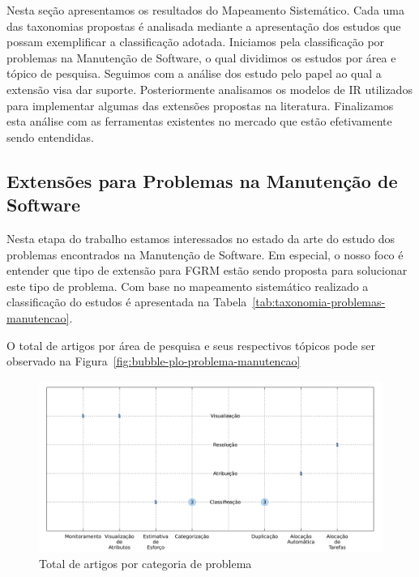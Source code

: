 Nesta seção apresentamos os resultados do Mapeamento Sistemático. Cada uma das taxonomias propostas
é analisada mediante a apresentação dos estudos que possam exemplificar a classificação adotada.
Iniciamos pela classificação por problemas na Manutenção de Software, o qual dividimos os estudos
por área e tópico de pesquisa. Seguimos com a análise dos estudo pelo papel ao qual a extensão visa
dar suporte. Posteriormente analisamos os modelos de IR utilizados para implementar algumas das
extensões propostas na literatura. Finalizamos esta análise com as ferramentas existentes no mercado
que estão efetivamente sendo entendidas.

\subsection{Extensões para Problemas na Manutenção de Software}
\label{sub:extensões_para_problemas_na_manutenção_de_software}

Nesta etapa do trabalho estamos interessados no estado da arte do estudo dos problemas encontrados
na Manutenção de Software. Em especial, o nosso foco é entender que tipo de extensão para FGRM estão
sendo proposta para solucionar este tipo de problema. Com base no mapeamento sistemático realizado a
classificação do estudos é apresentada na Tabela~\ref{tab:taxonomia-problemas-manutencao}.


O total de artigos por área de pesquisa e seus respectivos tópicos pode ser observado na Figura~\ref{fig:bubble-plo-problema-manutencao}



\begin{figure}[htpb]
	\centering
	\includegraphics[width=0.8\linewidth]{./chapter-mapeamento-sistematico/img/bubble-plot-problema-manutencao.pdf}
	\caption{Total de artigos por categoria de problema}
	\label{fig:bubble-plot-problema-manutencao}
\end{figure}

